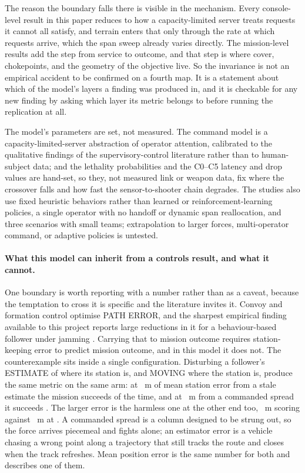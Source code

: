 \documentclass[11pt]{article}
\begin{document}
The reason the boundary falls there is visible in the mechanism. Every console-level result in this
paper reduces to how a capacity-limited server treats requests it cannot all satisfy, and terrain
enters that only through the rate at which requests arrive, which the span sweep already varies
directly. The mission-level results add the step from service to outcome, and that step is where
cover, chokepoints, and the geometry of the objective live. So the invariance is not an empirical
accident to be confirmed on a fourth map. It is a statement about which of the model's layers a
finding was produced in, and it is checkable for any new finding by asking which layer its metric
belongs to before running the replication at all.

The model's parameters are set, not measured. The command model is a capacity-limited-server abstraction of operator attention, calibrated to the qualitative findings of the supervisory-control literature rather than to human-subject data; and the lethality probabilities and the C0--C5 latency and drop values are hand-set, so they, not measured link or weapon data, fix where the crossover falls and how fast the sensor-to-shooter chain degrades. The studies also use fixed heuristic behaviors rather than learned or reinforcement-learning policies, a single operator with no handoff or dynamic span reallocation, and three scenarios with small teams; extrapolation to larger forces, multi-operator command, or adaptive policies is untested.

\paragraph{What this model can inherit from a controls result, and what it cannot.} One boundary is
worth reporting with a number rather than as a caveat, because the temptation to cross it is
specific and the literature invites it. Convoy and formation control optimise PATH ERROR, and the
sharpest empirical finding available to this project reports large reductions in it for a
behaviour-based follower under jamming \citep{cheung2022convoy}. Carrying that to mission outcome
requires station-keeping error to predict mission outcome, and in this model it does not. The
counterexample sits inside a single configuration. Disturbing a follower's ESTIMATE of where its
station is, and MOVING where the station is, produce the same metric on the same arm: at
\FoDisEstErr{}~m of mean station error from a stale estimate the mission succeeds \FoDisEstSuc{} of
the time, and at \FoDisCmdErr{}~m from a commanded spread it succeeds \FoDisCmdSuc{}. The larger
error is the harmless one at the other end too, \FoDisEstBigErr{}~m scoring \FoDisEstBigSuc{}
against \FoDisCmdBigErr{}~m at \FoDisCmdBigSuc{}. A commanded spread is a column designed to be
strung out, so the force arrives piecemeal and fights alone; an estimator error is a vehicle chasing
a wrong point along a trajectory that still tracks the route and closes when the track refreshes.
Mean position error is the same number for both and describes one of them.
\end{document}
